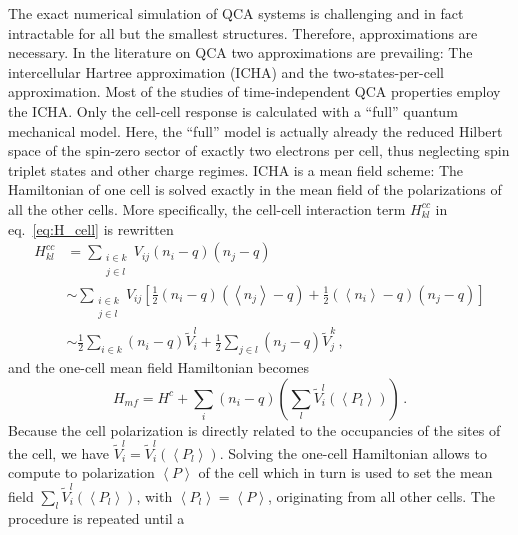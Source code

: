 The exact numerical simulation of QCA systems is challenging and in fact
intractable for all but the smallest structures. Therefore, approximations are
necessary. In the literature on QCA two approximations are prevailing: The
intercellular Hartree approximation (ICHA) and the two-states-per-cell
approximation. Most of the studies of time-independent QCA properties employ the
ICHA. Only the cell-cell response is calculated with a ``full'' quantum mechanical
model. Here, the ``full'' model is actually already the reduced Hilbert space of the
spin-zero sector of exactly two electrons per cell, thus neglecting spin triplet
states and other charge regimes. ICHA is a mean field scheme: The Hamiltonian of
one cell is solved exactly in the mean field of the polarizations of all the
other cells. More specifically, the cell-cell interaction term $H^{cc}_{kl}$ in
eq.~\eqref{eq:H_cell} is rewritten
\begin{equation}
\begin{split}
  \label{eq:H_kl_meanfield}
  H^{cc}_{kl} 
  &=
  \sum_{\substack{i \in k\\j \in l}} V_{ij} \left( n_i - q \right) \left( n_j - q \right) \\
  &\sim
  \sum_{\substack{i \in k\\j \in l}} V_{ij} 
       \left[ \frac{1}{2} 
              \left( n_i - q \right) \left( \left< n_j \right> - q \right)
              +
              \frac{1}{2}
              \left( \left< n_i \right> - q \right) \left( n_j - q \right)
       \right] \\
  &\sim
  \frac{1}{2} \sum_{i \in k} \left( n_i - q \right) \tilde{V}_i^l
       +
       \frac{1}{2} \sum_{j \in l} \left( n_j - q \right) \tilde{V}_j^k \, ,
\end{split}
\end{equation}
and the one-cell mean field Hamiltonian becomes
\begin{equation}
  \label{eq:H_meanfield}
  H_{mf} = H^c + \sum_i \left( n_i - q \right) \left( \sum_l \tilde{V}_i^l(\left<P_l\right>) \right) \, .
\end{equation}
Because the cell polarization is directly related to the occupancies of the
sites of the cell, we have $\tilde{V}_i^l = \tilde{V}_i^l(\left<P_l\right>)$.
Solving the one-cell Hamiltonian allows to compute to polarization $\left< P
\right>$ of the cell which in turn is used to set the mean field $\sum_l
\tilde{V}_i^l(\left<P_l\right>)$, with $\left<P_l\right> = \left<P\right>$,
originating from all other cells. The procedure is repeated until a
